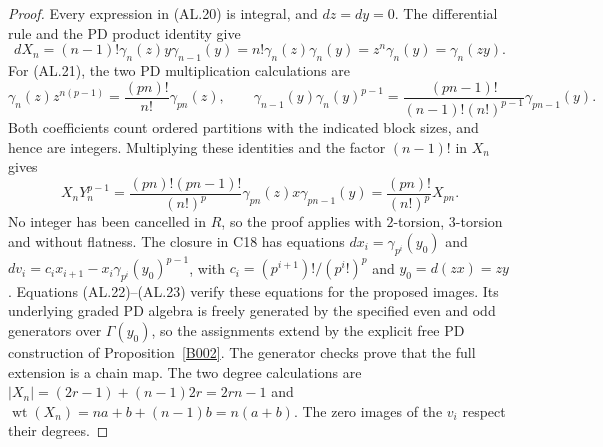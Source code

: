 \begin{proof}
Every expression in \textup{(AL.20)} is integral, and $dz=dy=0$.
The differential rule and the PD product identity give
\[
 dX_n=(n-1)!\gamma_n(z)y\gamma_{n-1}(y)
     =n!\gamma_n(z)\gamma_n(y)
     =z^n\gamma_n(y)=\gamma_n(zy).
 \tag{AL.22}
\]
For \textup{(AL.21)}, the two PD multiplication calculations are
\[
 \gamma_n(z)z^{n(p-1)}
       =\frac{(pn)!}{n!}\gamma_{pn}(z),\qquad
 \gamma_{n-1}(y)\gamma_n(y)^{p-1}
       =\frac{(pn-1)!}{(n-1)!(n!)^{p-1}}
                         \gamma_{pn-1}(y).
 \tag{AL.23}
\]
Both coefficients count ordered partitions with the indicated
block sizes, and hence are integers.  Multiplying these
identities and the factor $(n-1)!$ in $X_n$ gives
\[
 X_nY_n^{p-1}
  =\frac{(pn)!(pn-1)!}{(n!)^p}
            \gamma_{pn}(z)x\gamma_{pn-1}(y)
  =\frac{(pn)!}{(n!)^p}X_{pn}.
\]
No integer has been cancelled in $R$, so the proof applies
with $2$-torsion, $3$-torsion and without flatness.
The closure in C18 has equations
$dx_i=\gamma_{p^i}(y_0)$ and
$dv_i=c_i x_{i+1}-x_i\gamma_{p^i}(y_0)^{p-1}$, with
$c_i=(p^{i+1})!/(p^i!)^p$ and $y_0=d(zx)=zy$.
Equations \textup{(AL.22)--(AL.23)} verify these equations
for the proposed images.  Its underlying graded PD algebra
is freely generated by the specified even and odd generators
over $\Gamma(y_0)$, so the assignments extend by the explicit
free PD construction of Proposition~\ref{B002}.
The generator checks prove that the full extension is a
chain map.  The two degree calculations are
$|X_n|=(2r-1)+(n-1)2r=2rn-1$ and
$\operatorname{wt}(X_n)=na+b+(n-1)b=n(a+b)$.
The zero images of the $v_i$ respect their degrees.
\end{proof}

